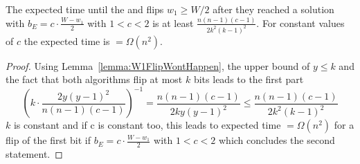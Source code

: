 \begin{corollary}\label{corollary:W1FlipWontHappen}
      The expected time until the \RLSR[k] and \RLSN[k] flips $w_1\ge W/2$ after they reached a solution with $b_E = c\cdot\frac{W-w_1}{2}$ with $1<c<2$ is at least \(\frac{n(n-1)(c-1)}{2k^2{(k-1)}^2}\). For constant values of $c$ the expected time is $=\Omega(n^2)$.
\end{corollary}
\begin{proof}
      Using Lemma~\ref{lemma:W1FlipWontHappen}, the upper bound of $y\le k$ and the fact that both algorithms flip at most $k$ bits leads to the first part
      \[ {(k\cdot\frac{2y{(y-1)}^2}{n(n-1)(c-1)})}^{-1}=\frac{n(n-1)(c-1)}{2ky{(y-1)}^2} \le\frac{n(n-1)(c-1)}{2k^2{(k-1)}^2}\]
      $k$ is constant and if c is constant too, this leads to expected time $=\Omega(n^2)$ for a flip of the first bit if $b_E = c\cdot\frac{W-w_1}{2}$ with $1<c<2$ which concludes the second statement.
\end{proof}

